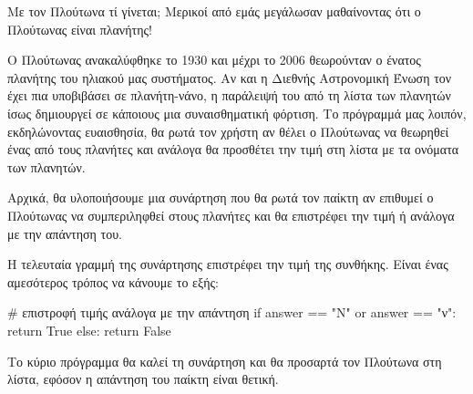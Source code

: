 \documentclass[a4paper,11pt,oneside]{book}
\begin{document}
\begin{question}
Με τον Πλούτωνα τί γίνεται; Μερικοί από εμάς μεγάλωσαν μαθαίνοντας ότι ο Πλούτωνας είναι πλανήτης!
\end{question}

Ο Πλούτωνας ανακαλύφθηκε το 1930 και μέχρι το 2006 θεωρούνταν ο ένατος πλανήτης του ηλιακού μας συστήματος. Αν και η Διεθνής Αστρονομική Ένωση τον έχει πια υποβιβάσει σε πλανήτη-νάνο, η παράλειψή του από τη λίστα των πλανητών ίσως δημιουργεί σε κάποιους μια συναισθηματική φόρτιση. Το πρόγραμμά μας λοιπόν, εκδηλώνοντας ευαισθησία, θα ρωτά τον χρήστη αν θέλει ο Πλούτωνας να θεωρηθεί ένας από τους πλανήτες και ανάλογα θα προσθέτει την τιμή  στη λίστα με τα ονόματα των πλανητών.

Αρχικά, θα υλοποιήσουμε μια συνάρτηση που θα ρωτά τον παίκτη αν επιθυμεί ο Πλούτωνας να συμπεριληφθεί στους πλανήτες και θα επιστρέφει την τιμή  ή  ανάλογα με την απάντηση του.



Η τελευταία γραμμή της συνάρτησης επιστρέφει την τιμή της συνθήκης. Είναι ένας αμεσότερος τρόπος να κάνουμε το εξής:

\begin{pycode}
    # επιστροφή τιμής ανάλογα με την απάντηση
    if answer == "Ν" or answer == "ν":
        return True
    else:
        return False
\end{pycode}

Το κύριο πρόγραμμα θα καλεί τη συνάρτηση  και θα προσαρτά τον Πλούτωνα στη λίστα, εφόσον η απάντηση του παίκτη είναι θετική.

\end{document}
